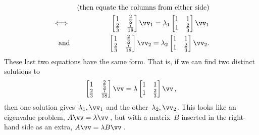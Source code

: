 \begin{draft}
\begin{example}
\begin{solution}
\begin{enumerate}
\begin{eqnarray*}
\\&&(\text{then equate the columns from either side})
\\\iff&&\begin{bmatrix} 1&\tfrac23\\\tfrac23&\frac7{18} \end{bmatrix}\vv_1=\lambda_1\begin{bmatrix} 1&1\\1&\tfrac23 \end{bmatrix}\vv_1
\\\text{and}&&\begin{bmatrix} 1&\tfrac23\\\tfrac23&\frac7{18} \end{bmatrix}\vv_2=\lambda_2\begin{bmatrix} 1&1\\1&\tfrac23 \end{bmatrix}\vv_2.
\end{eqnarray*}
These last two equations have the same form.
That is, if we can find two distinct solutions to
\begin{equation*}
\begin{bmatrix} 1&\tfrac23\\\tfrac23&\frac7{18} \end{bmatrix}\vv=\lambda\begin{bmatrix} 1&1\\1&\tfrac23 \end{bmatrix}\vv\,,
\end{equation*}
then one solution gives~\(\lambda_1,\vv_1\) and the other~\(\lambda_2,\vv_2\).
This looks like an eigenvalue problem, \(A\vv=\lambda\vv\)\,, but with a matrix~\(B\) inserted in the right-hand side as an extra, \(A\vv=\lambda B\vv\)\,.


\end{enumerate}
\end{solution}
\end{example}
\end{draft}
